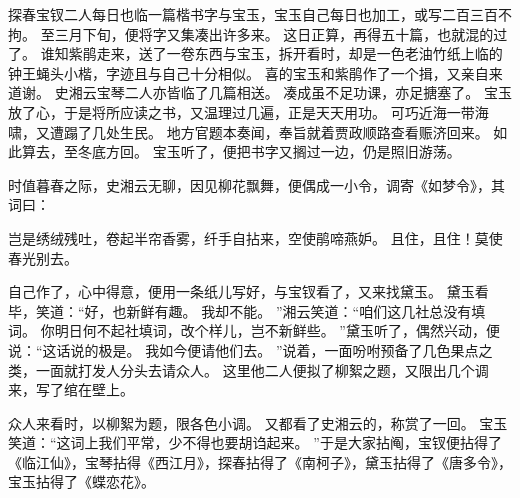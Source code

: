 探春宝钗二人每日也临一篇楷书字与宝玉，宝玉自己每日也加工，或写二百三百不拘。
至三月下旬，便将字又集凑出许多来。
这日正算，再得五十篇，也就混的过了。
谁知紫鹃走来，送了一卷东西与宝玉，拆开看时，却是一色老油竹纸上临的钟王蝇头小楷，字迹且与自己十分相似。
喜的宝玉和紫鹃作了一个揖，又亲自来道谢。
史湘云宝琴二人亦皆临了几篇相送。
凑成虽不足功课，亦足搪塞了。
宝玉放了心，于是将所应读之书，又温理过几遍，正是天天用功。
可巧近海一带海啸，又遭蹋了几处生民。
地方官题本奏闻，奉旨就着贾政顺路查看赈济回来。
如此算去，至冬底方回。
宝玉听了，便把书字又搁过一边，仍是照旧游荡。
\par
时值暮春之际，史湘云无聊，因见柳花飘舞，便偶成一小令，调寄《如梦令》，其词曰：\par
\par
岂是绣绒残吐，卷起半帘香雾，纤手自拈来，空使鹃啼燕妒。
且住，且住！莫使春光别去。
\par
{}
\par
\hop
自己作了，心中得意，便用一条纸儿写好，与宝钗看了，又来找黛玉。
黛玉看毕，笑道：“好，也新鲜有趣。
我却不能。
”湘云笑道：“咱们这几社总没有填词。
你明日何不起社填词，改个样儿，岂不新鲜些。
”黛玉听了，偶然兴动，便说：“这话说的极是。
我如今便请他们去。
”说着，一面吩咐预备了几色果点之类，一面就打发人分头去请众人。
这里他二人便拟了柳絮之题，又限出几个调来，写了绾在壁上。
\par
众人来看时，以柳絮为题，限各色小调。
又都看了史湘云的，称赏了一回。
宝玉笑道：“这词上我们平常，少不得也要胡诌起来。
”于是大家拈阄，宝钗便拈得了《临江仙》，宝琴拈得《西江月》，探春拈得了《南柯子》，黛玉拈得了《唐多令》，宝玉拈得了《蝶恋花》。
